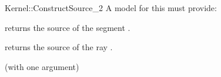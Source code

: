 \begin{ccRefFunctionObjectConcept}{Kernel::ConstructSource_2}
A model for this must provide:


 {returns the source of
  the segment .}

 {returns the source of
  the ray .}

\ccRefines
{} (with one argument)

\ccSeeAlso
{}\\

\end{ccRefFunctionObjectConcept}
